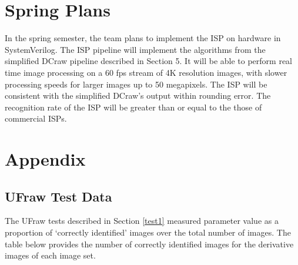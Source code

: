 \documentclass{report}
\begin{document}
\chapter{Spring Plans}
	In the spring semester, the team plans to implement the ISP on hardware in SystemVerilog. The ISP pipeline will implement the algorithms from the simplified DCraw pipeline described in Section 5. It will be able to perform real time image processing on a 60 fps stream of 4K resolution images, with slower processing speeds for larger images up to 50 megapixels. The ISP will be consistent with the simplified DCraw's output within rounding error. The recognition rate of the ISP will be greater than or equal to the those of commercial ISPs.  
	
\chapter{Appendix}

\section{UFraw Test Data} \label{dcrawdata}

The UFraw tests described in Section \ref{test1} measured parameter value as a proportion of `correctly identified' images over the total number of images. The table below provides the number of correctly identified images for the derivative images of each image set.
\end{document}
